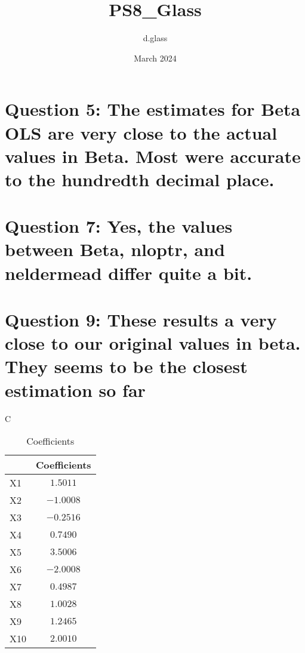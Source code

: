 \documentclass{article}
\title{PS8_Glass}
\author{d.glass }
\date{March 2024}
\begin{document}
\section{Question 5:
The estimates for Beta OLS are very close to the actual values in Beta. Most were accurate to the hundredth decimal place. }

\section{Question 7:
Yes, the values between Beta, nloptr, and neldermead differ quite a bit.}

\section{Question 9:
These results a very close to our original values in beta. They seems to be the closest estimation so far}
C\begin{table}[htbp]
\centering
\begin{tabular}{l c}
\hline
 & Coefficients \\
\hline
X1  & $1.5011$ \\
X2  & $-1.0008$ \\
X3  & $-0.2516$ \\
X4  & $0.7490$ \\
X5  & $3.5006$ \\
X6  & $-2.0008$ \\
X7  & $0.4987$ \\
X8  & $1.0028$ \\
X9  & $1.2465$ \\
X10 & $2.0010$ \\
\hline
\end{tabular}
\caption{Coefficients}
\end{table}
\end{document}

